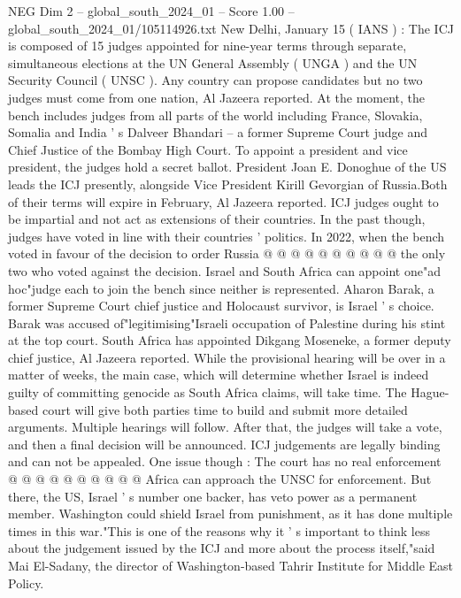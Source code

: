 \begin{textsample}{NEG Dim 2 – global\_south\_2024\_01 – Score 1.00 – global\_south\_2024\_01/105114926.txt}  \label{ex:f2_neg_327}
New Delhi, January 15 ( IANS ) : The ICJ is composed of 15 judges appointed for nine-year terms through separate, simultaneous elections at the UN General Assembly ( UNGA ) and the UN Security Council ( UNSC ).
Any country can propose candidates but no two judges must come from one nation, Al Jazeera reported.
At the moment, the bench includes judges from all parts of the world including France, Slovakia, Somalia and India ' s Dalveer Bhandari -- a former Supreme Court judge and Chief Justice of the Bombay High Court.
To appoint a president and vice president, the judges hold a secret ballot.
President Joan E.
Donoghue of the US leads the ICJ presently, alongside Vice President Kirill Gevorgian of Russia.Both of their terms will expire in February, Al Jazeera reported.
ICJ judges ought to be impartial and not act as extensions of their countries.
In the past though, judges have voted in line with their countries ' politics.
In 2022, when the bench voted in favour of the decision to order Russia @ @ @ @ @ @ @ @ @ @ the only two who voted against the decision.
Israel and South Africa can appoint one"ad hoc"judge each to join the bench since neither is represented.
Aharon Barak, a former Supreme Court chief justice and Holocaust survivor, is Israel ' s choice.
Barak was accused of"legitimising"Israeli occupation of Palestine during his stint at the top court.
South Africa has appointed Dikgang Moseneke, a former deputy chief justice, Al Jazeera reported.
While the provisional hearing will be over in a matter of weeks, the main case, which will determine whether Israel is indeed guilty of committing genocide as South Africa claims, will take time.
The Hague-based court will give both parties time to build and submit more detailed arguments.
Multiple hearings will follow.
After that, the judges will take a vote, and then a final decision will be announced.
ICJ judgements are legally binding and can not be appealed.
One issue though : The court has no real enforcement @ @ @ @ @ @ @ @ @ @ Africa can approach the UNSC for enforcement.
But there, the US, Israel ' s number one backer, has veto power as a permanent member.
Washington could shield Israel from punishment, as it has done multiple times in this war."This is one of the reasons why it ' s important to think less about the judgement issued by the ICJ and more about the process itself,"said Mai El-Sadany, the director of Washington-based Tahrir Institute for Middle East Policy.

\end{textsample}
